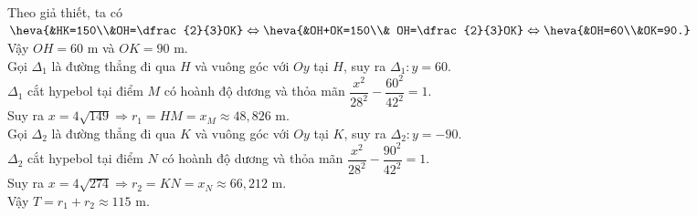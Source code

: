 \begin{bt}
{\begin{center}
		\end{center}
		Theo giả thiết,  ta có $\heva{&HK=150\\&OH=\dfrac{2}{3}OK}\Leftrightarrow \heva{&OH+OK=150\\& OH=\dfrac{2}{3}OK}\Leftrightarrow \heva{&OH=60\\&OK=90.}$\\
		Vậy  $OH=60$ m và $OK=90$ m.\\
		 Gọi $\Delta_1$ là đường thẳng đi qua $H$ và vuông góc với $Oy$ tại $H$, suy ra $\Delta_1\colon y=60$.\\
		$\Delta_1$ cắt hypebol tại  điểm $M$ có hoành độ dương và thỏa mãn $\dfrac{x^2}{28^2}-\dfrac{60^2}{42^2}=1$.\\
		Suy ra $x=4\sqrt{149}\Rightarrow r_1=HM=x_M\approx 48{,}826$ m.\\ 
		Gọi $\Delta_2$ là đường thẳng đi qua $K$ và vuông góc với $Oy$  tại $K$, suy ra $\Delta_2\colon y=-90$.\\
		$\Delta_2$ cắt hypebol tại điểm $N$  có hoành độ dương và thỏa mãn $\dfrac{x^2}{28^2}-\dfrac{90^2}{42^2}=1$.\\
		Suy ra $x=4\sqrt{274}\Rightarrow r_2=KN=x_N\approx 66{,}212$  m.\\
		Vậy $T=r_1+r_2\approx  115$ m.
	 }
\end{bt}

